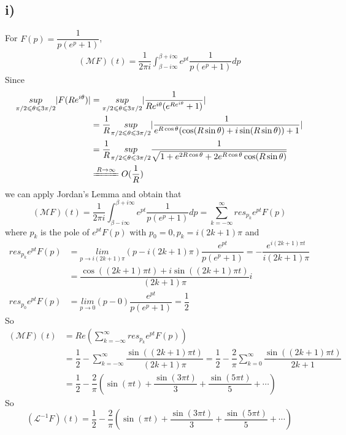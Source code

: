 \documentclass[a4paper,12pt,titlepage]{article}
\begin{document}
\subsection*{i)}
For $F(p)=\dfrac{1}{p(e^p+1)}$, 
\begin{align*}
(\mathcal{M}F)(t)=\dfrac{1}{2\pi i}\int_{\beta-i\infty}^{\beta+i\infty}e^{pt}\dfrac{1}{p(e^p+1)}dp
\end{align*}
Since
\begin{align*}
\underset{\pi/2\leqslant\theta\leqslant3\pi/2}{sup}|F(Re^{i\theta})|&=\underset{\pi/2\leqslant\theta\leqslant3\pi/2}{sup}|\dfrac{1}{Re^{i\theta}(e^{Re^{i\theta}}+1)}|\\
&=\dfrac{1}{R}\underset{\pi/2\leqslant\theta\leqslant3\pi/2}{sup}|\dfrac{1}{e^{R\cos\theta}(\cos(R\sin\theta)+i\sin(R\sin\theta))+1}|\\
&=\dfrac{1}{R}\underset{\pi/2\leqslant\theta\leqslant3\pi/2}{sup}\dfrac{1}{\sqrt{1+e^{2R\cos\theta}+2e^{R\cos\theta}\cos(R\sin\theta)}}\\
&\xlongequal{R\rightarrow\infty} O(\dfrac{1}{R})
\end{align*}
we can apply Jordan's Lemma and obtain that
$$(\mathcal{M}F)(t)=\dfrac{1}{2\pi i}\int_{\beta-i\infty}^{\beta+i\infty}e^{pt}\dfrac{1}{p(e^p+1)}dp=\sum\limits_{k=-\infty}^{\infty}res_{p_k}e^{pt}F(p)$$
where $p_k$ is the pole of $e^{pt}F(p)$ with $p_0=0,p_k=i(2k+1)\pi$ and 
\begin{align*}
res_{p_k}e^{pt}F(p)&=\underset{p\rightarrow i(2k+1)\pi}{lim}(p-i(2k+1)\pi)\dfrac{e^{pt}}{p(e^p+1)}=-\dfrac{e^{i(2k+1)\pi t}}{i(2k+1)\pi}\\
&=\dfrac{\cos((2k+1)\pi t)+i\sin((2k+1)\pi t)}{(2k+1)\pi}i\\
res_{p_0}e^{pt}F(p)&=\underset{p\rightarrow 0}{lim}(p-0)\dfrac{e^{pt}}{p(e^p+1)}=\dfrac{1}{2}
\end{align*}
So
\begin{align*}
(\mathcal{M}F)(t)&=Re(\sum\limits_{k=-\infty}^{\infty}res_{p_k}e^{pt}F(p))\\
&=\dfrac{1}{2}-\sum\limits_{k=-\infty}^{\infty}\dfrac{\sin((2k+1)\pi t)}{(2k+1)\pi}=\dfrac{1}{2}-\dfrac{2}{\pi}\sum\limits_{k=0}^{\infty}\dfrac{\sin((2k+1)\pi t)}{2k+1}\\
&=\dfrac{1}{2}-\dfrac{2}{\pi}(\sin(\pi t)+\dfrac{\sin(3\pi t)}{3}+\dfrac{\sin(5\pi t)}{5}+\cdots)
\end{align*}
So
$$(\mathcal{L}^{-1}F)(t)=\dfrac{1}{2}-\dfrac{2}{\pi}(\sin(\pi t)+\dfrac{\sin(3\pi t)}{3}+\dfrac{\sin(5\pi t)}{5}+\cdots)$$
\end{document}
